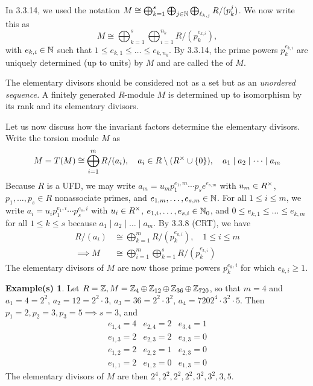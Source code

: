 \documentclass[11pt]{book}
\theoremstyle{definition}   \newtheorem{defn}[counter]{Definition} %
\newtheorem*{example*}{Example(s)}   \newtheorem*{warning}{Warning}
\newcommand{\bs}{\setminus}   \newcommand{\A}{\mathcal{A}}   \newcommand{\sy}{\textnormal{Syl}}   \newcommand{\size}[1]{\left| #1 \right|}
\newcommand{\vs}{\vspace{8pt}}   \newcommand{\hs}{\hspace{8pt}}
\numberwithin{counter}{chapter}
\begin{document}
\vs

In 3.3.14, we used the notation $M \cong \bigoplus_{k=1}^s \bigoplus_{j \in \operatorname{\mathbb{N}}} \bigoplus_{\ell_{k,j}} R/(p_k^j)$. We now write this as
	\[M \cong \bigoplus_{k=1}^s \bigoplus_{i=1}^{n_k} R/(p_k^{e_{k,i}}), \]
with $e_{k,i} \in \operatorname{\mathbb{N}}$ such that $1 \leq e_{k,1} \leq \dots \leq e_{k,n_k}$. By 3.3.14, the prime powers $p_k^{e_{k,i}}$ are uniquely determined (up to units) by $M$ and are called the  of $M$.

\vs

\begin{remark}[+ Discussion]
The elementary divisors should be considered not as a set but as an \emph{unordered sequence.} A finitely generated $R$-module $M$ is determined up to isomorphism by its rank and its elementary divisors.

Let us now discuss how the invariant factors determine the elementary divisors. Write the torsion module $M$ as
	\[M = T(M) \cong \bigoplus_{i=1}^m R/(a_i), \quad a_i \in R\bs(R\x \cup \{0\}), \quad a_1 \mid a_2 \mid \dots \mid a_m \]
Because $R$ is a UFD, we may write $a_m = u_m p_1^{e_1,m} \cdots p_s e^{e_{s,m}}$ with $u_m \in R^{\times}$, $p_1,\dots,p_s \in R$ nonassociate primes, and $e_{1,m},\dots,e_{s,m} \in \operatorname{\mathbb{N}}$. For all $1 \leq i \leq m$, we write $a_i = u_i p_1 ^{e_1,i} \cdots p_s ^{e_s,i}$ with $u_i \in R^{\times}$, $e_{1,i},\dots,e_{s,i} \in \operatorname{\mathbb{N}}_0$, and $0 \leq e_{k,1} \leq \dots \leq e_{k,m}$ for all $1 \leq k \leq s$ because $a_1 \mid a_2 \mid \dots \mid a_m$. By 3.3.8 (CRT), we have
\begin{align*}
R/(a_i) &\cong \bigoplus_{k=1}^m R/(p_k^{e_{k,i}}), \quad 1 \leq i \leq m \\
\implies M &\cong \bigoplus_{i=1}^m \bigoplus_{k=1}^s R/(p_k^{e_{k,i}})
\end{align*}
The elementary divisors of $M$ are now those prime powers $p_k^{e_k,i}$ for which $e_{k,i} \geq 1$.

\vs

\begin{example*}
Let $R = \operatorname{\mathbb{Z}}, M = \operatorname{\mathbb{Z}}_4 \oplus \operatorname{\mathbb{Z}}_{12} \oplus \operatorname{\mathbb{Z}}_{36} \oplus \operatorname{\mathbb{Z}}_{720}$, so that $m = 4$ and $a_1 = 4 = 2^2$, $a_2 = 12 = 2^2 \cdot 3$, $a_3 = 36 = 2^2 \cdot 3^2$, $a_4 = 720 2^4 \cdot 3^2 \cdot 5$. Then $p_1 = 2, p_2 = 3, p_3 = 5 \implies s=3$, and
\[\begin{array}{rrr}
e_{1,4} = 4 & e_{2,4} = 2 & e_{3,4} = 1 \\
e_{1,3} = 2 & e_{2,3} = 2 & e_{3,3} = 0 \\
e_{1,2} = 2 & e_{2,2} = 1 & e_{2,3} = 0 \\
e_{1,1} = 2 & e_{1,2} = 0 & e_{1,3} = 0
\end{array} \]
The elementary divisors of $M$ are then $2^4,2^2,2^2,2^2,3^2,3^2,3,5$.
\end{example*}


\end{remark}
\end{document}
